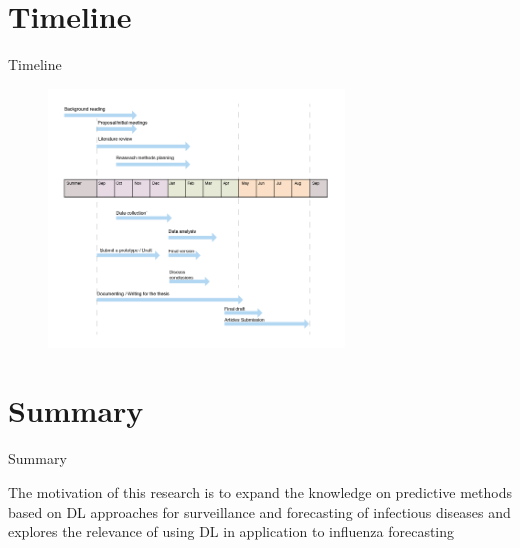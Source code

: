\documentclass{beamer}
\begin{document}
\section{Timeline}

\begin{frame}{Timeline}
\begin{figure}[h]
    \centering
    \includegraphics[width=0.7\textwidth]{figure-2.png}
\end{figure}
\end{frame}

\section*{Summary}
\begin{frame}{Summary}

The motivation of this research is to expand the knowledge on predictive methods based on DL approaches for surveillance and forecasting of infectious diseases and explores the relevance of using DL in application to influenza forecasting
\end{frame}



\end{document}
